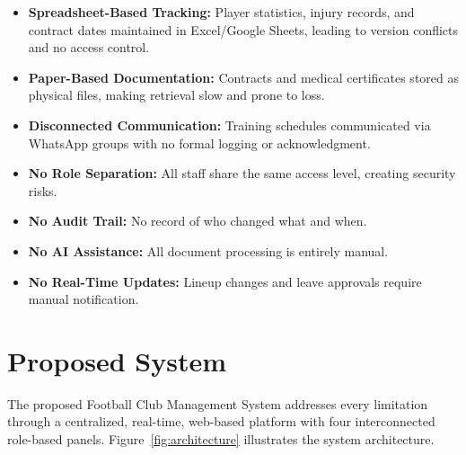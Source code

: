 \documentclass[12pt,a4paper,oneside]{report}
\begin{document}
\begin{itemize}[leftmargin=*]
  \item \textbf{Spreadsheet-Based Tracking:} Player statistics, injury records, and contract dates maintained in Excel/Google Sheets, leading to version conflicts and no access control.
  \item \textbf{Paper-Based Documentation:} Contracts and medical certificates stored as physical files, making retrieval slow and prone to loss.
  \item \textbf{Disconnected Communication:} Training schedules communicated via WhatsApp groups with no formal logging or acknowledgment.
  \item \textbf{No Role Separation:} All staff share the same access level, creating security risks.
  \item \textbf{No Audit Trail:} No record of who changed what and when.
  \item \textbf{No AI Assistance:} All document processing is entirely manual.
  \item \textbf{No Real-Time Updates:} Lineup changes and leave approvals require manual notification.
\end{itemize}

\section{Proposed System}

The proposed Football Club Management System addresses every limitation through a centralized, real-time, web-based platform with four interconnected role-based panels. Figure~\ref{fig:architecture} illustrates the system architecture.
\end{document}
